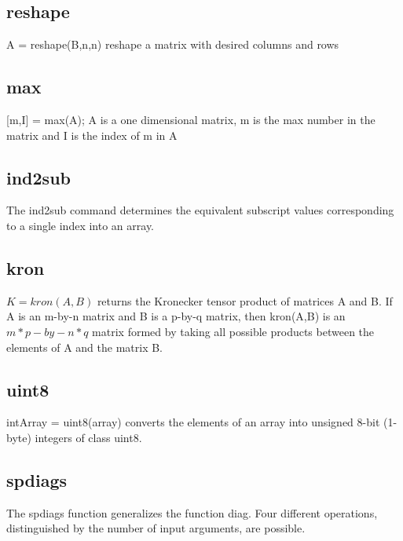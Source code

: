 \documentclass[12pt,letterpaper]{article}
\begin{document}
\subsection{reshape}
A = reshape(B,n,n) reshape a matrix with desired columns and rows

\subsection{max}
[m,I] = max(A);
A is a one dimensional matrix, m is the max number in the matrix and I is the index of m in A

\subsection{ind2sub}
The ind2sub command determines the equivalent subscript values corresponding to a single index into an array.

\subsection{kron}
$K = kron(A,B)$ returns the Kronecker tensor product of matrices A and B. If A is an m-by-n matrix and B is a p-by-q matrix, then kron(A,B) is an $m*p-by-n*q$ matrix formed by taking all possible products between the elements of A and the matrix B.

\subsection{uint8}
intArray = uint8(array) converts the elements of an array into unsigned 8-bit (1-byte) integers of class uint8.

\subsection{spdiags}
The spdiags function generalizes the function diag. Four different operations, distinguished by the number of input arguments, are possible.

\section{}
\end{document}

